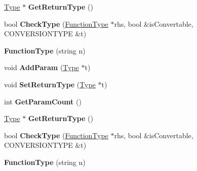 \begin{DoxyCompactItemize}
\item 
\hypertarget{classFunctionType_a601e763553086c0d7a4c2de97d6de2bc}{\hyperlink{classType}{Type} $\ast$ {\bfseries Get\-Return\-Type} ()}\label{classFunctionType_a601e763553086c0d7a4c2de97d6de2bc}

\item 
\hypertarget{classFunctionType_a150840d05c02a26ca776aad22e0deed1}{bool {\bfseries Check\-Type} (\hyperlink{classFunctionType}{Function\-Type} $\ast$rhs, bool \&is\-Convertable, C\-O\-N\-V\-E\-R\-S\-I\-O\-N\-T\-Y\-P\-E \&t)}\label{classFunctionType_a150840d05c02a26ca776aad22e0deed1}

\item 
\hypertarget{classFunctionType_a924981ea6fc18a7a9ed4cb5c94a136d6}{{\bfseries Function\-Type} (string n)}\label{classFunctionType_a924981ea6fc18a7a9ed4cb5c94a136d6}

\item 
\hypertarget{classFunctionType_a9259c94250b6cb903c6013bc10a0b7bc}{void {\bfseries Add\-Param} (\hyperlink{classType}{Type} $\ast$t)}\label{classFunctionType_a9259c94250b6cb903c6013bc10a0b7bc}

\item 
\hypertarget{classFunctionType_a1462775c5732b70b07c689ab7088814d}{void {\bfseries Set\-Return\-Type} (\hyperlink{classType}{Type} $\ast$t)}\label{classFunctionType_a1462775c5732b70b07c689ab7088814d}

\item 
\hypertarget{classFunctionType_a8b6fed7ff4d79b5db3d39cd042326090}{int {\bfseries Get\-Param\-Count} ()}\label{classFunctionType_a8b6fed7ff4d79b5db3d39cd042326090}

\item 
\hypertarget{classFunctionType_a601e763553086c0d7a4c2de97d6de2bc}{\hyperlink{classType}{Type} $\ast$ {\bfseries Get\-Return\-Type} ()}\label{classFunctionType_a601e763553086c0d7a4c2de97d6de2bc}

\item 
\hypertarget{classFunctionType_a150840d05c02a26ca776aad22e0deed1}{bool {\bfseries Check\-Type} (\hyperlink{classFunctionType}{Function\-Type} $\ast$rhs, bool \&is\-Convertable, C\-O\-N\-V\-E\-R\-S\-I\-O\-N\-T\-Y\-P\-E \&t)}\label{classFunctionType_a150840d05c02a26ca776aad22e0deed1}

\item 
\hypertarget{classFunctionType_a924981ea6fc18a7a9ed4cb5c94a136d6}{{\bfseries Function\-Type} (string n)}\label{classFunctionType_a924981ea6fc18a7a9ed4cb5c94a136d6}


\end{DoxyCompactItemize}
